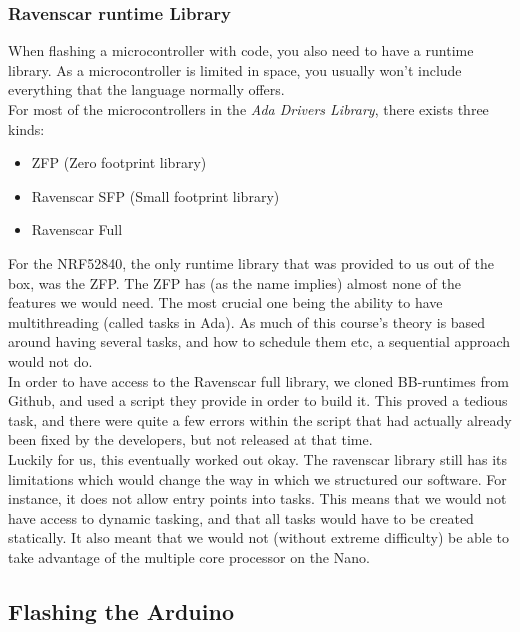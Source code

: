 \documentclass{article}
\begin{document}
\subsubsection{Ravenscar runtime Library}

When flashing a microcontroller with code, you also need to have a runtime library. As a microcontroller is limited in space, you usually won't include everything that the language normally offers.\\ 

For most of the microcontrollers in the \textit{Ada Drivers Library}, there exists three kinds:
\begin{itemize}
  \item{ZFP (Zero footprint library)}
  \item{Ravenscar SFP (Small footprint library)}
  \item{Ravenscar Full}
\end{itemize}

For the NRF52840, the only runtime library that was provided to us out of the box, was the ZFP. The ZFP has (as the name implies) almost none of the features we would need. The most crucial one being the ability to have multithreading (called tasks in Ada). As much of this course's theory is based around having several tasks, and how to schedule them etc, a sequential approach would not do.\\ 

In order to have access to the Ravenscar full library, we cloned BB-runtimes from Github, and used a script they provide in order to build it. This proved a tedious task, and there were quite a few errors within the script that had actually already been fixed by the developers, but not released at that time.\\ 
Luckily for us, this eventually worked out okay. The ravenscar library still has its limitations which would change the way in which we structured our software. For instance, it does not allow entry points into tasks. This means that we would not have access to dynamic tasking, and that all tasks would have to be created statically. It also meant that we would not (without extreme difficulty) be able to take advantage of the multiple core processor on the Nano.\\

\subsection{Flashing the Arduino}
\end{document}
